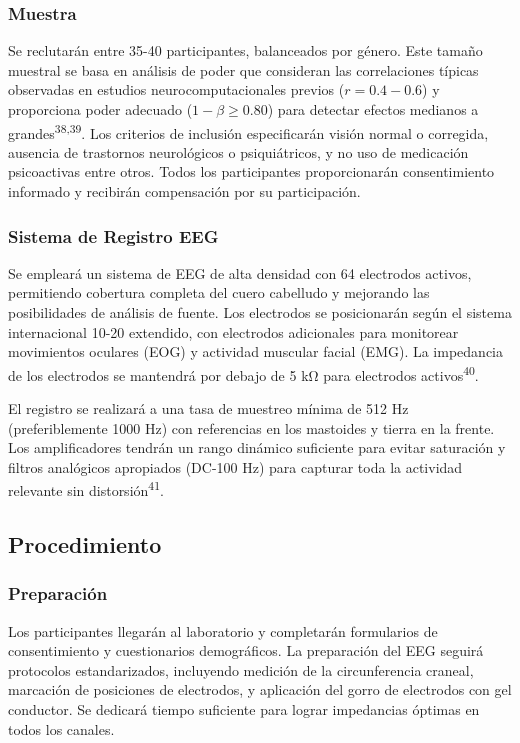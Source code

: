 \documentclass[
  spanish,
  10pt,
]{article}
\begin{document}
\subsubsection{Muestra}\label{muestra}

Se reclutarán entre 35-40 participantes, balanceados por género. Este
tamaño muestral se basa en análisis de poder que consideran las
correlaciones típicas observadas en estudios neurocomputacionales
previos (\(r = 0.4-0.6\)) y proporciona poder adecuado
(\(1-\beta \geq 0.80\)) para detectar efectos medianos a
grandes\textsuperscript{38,39}. Los criterios de inclusión especificarán
visión normal o corregida, ausencia de trastornos neurológicos o
psiquiátricos, y no uso de medicación psicoactivas entre otros. Todos
los participantes proporcionarán consentimiento informado y recibirán
compensación por su participación.

\subsubsection{Sistema de Registro EEG}\label{sistema-de-registro-eeg}

Se empleará un sistema de EEG de alta densidad con 64 electrodos
activos, permitiendo cobertura completa del cuero cabelludo y mejorando
las posibilidades de análisis de fuente. Los electrodos se posicionarán
según el sistema internacional 10-20 extendido, con electrodos
adicionales para monitorear movimientos oculares (EOG) y actividad
muscular facial (EMG). La impedancia de los electrodos se mantendrá por
debajo de 5 kΩ para electrodos activos\textsuperscript{40}.

El registro se realizará a una tasa de muestreo mínima de 512 Hz
(preferiblemente 1000 Hz) con referencias en los mastoides y tierra en
la frente. Los amplificadores tendrán un rango dinámico suficiente para
evitar saturación y filtros analógicos apropiados (DC-100 Hz) para
capturar toda la actividad relevante sin distorsión\textsuperscript{41}.

\subsection{Procedimiento}\label{procedimiento}

\subsubsection{Preparación}\label{preparaciuxf3n}

Los participantes llegarán al laboratorio y completarán formularios de
consentimiento y cuestionarios demográficos. La preparación del EEG
seguirá protocolos estandarizados, incluyendo medición de la
circunferencia craneal, marcación de posiciones de electrodos, y
aplicación del gorro de electrodos con gel conductor. Se dedicará tiempo
suficiente para lograr impedancias óptimas en todos los canales.
\end{document}
